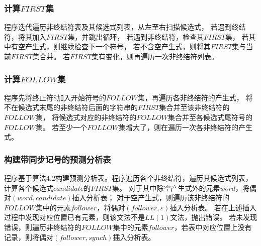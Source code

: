 \documentclass[UTF8]{ctexart}
\begin{document}
\subsubsection{计算$FIRST$集}
程序迭代遍历非终结符表及其候选式列表，从左至右扫描候选式，
若遇到终结符，将其加入$FIRST$集，并跳出循环，
若遇到非终结符，检查其$FIRST$集，
若其中有空产生式，则继续检查下一个符号，
若不含空产生式，则将其$FIRST$集与当前$FIRST$集合并。
若$FIRST$集有变化，则再遍历一次非终结符列表。
\subsubsection{计算$FOLLOW$集}
程序先将终止符$\$$加入开始符号的$FOLLOW$集，再遍历各非终结符的产生式，
将不在候选式末尾的非终结符后面的字符串的$FIRST$集合并至该非终结符的$FOLLOW$集，
将候选式对应的非终结符的$FOLLOW$集合并至各候选式尾符号的$FOLLOW$集。
若至少一个$FOLLOW$集增大了，则在遍历一次各非终结符的产生式。
\subsubsection{构建带同步记号的预测分析表}
程序基于算法$4.2$构建预测分析表。程序遍历各个非终结符，遍历其候选式列表，计算各个候选式$candidate$的$FIRST$集。
对于其中除空产生式外的元素$word$，将偶对$(word, candidate)$插入分析表；
对于空产生式，则遍历该非终结符的$FOLLOW$集中的元素$follower$，将偶对$(follower, \varepsilon)$插入分析表。
若在上述插入过程中发现对应位置已有元素，则该文法不是$LL(1)$文法，抛出错误。
若未发现错误，则遍历非终结符的$FOLLOW$集中的元素$follower$，若表中对应位置上没有记录，则将偶对$(follower, synch)$插入分析表。
\end{document}

